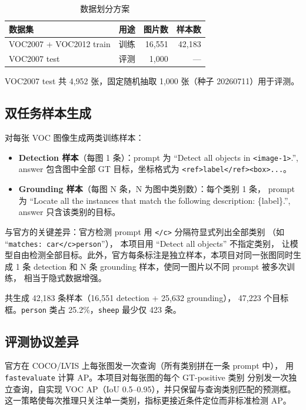 \documentclass[11pt,a4paper]{article}
\begin{document}
\begin{table}[H]
\centering\small
\caption{数据划分方案}\label{tab:split}
\begin{tabularx}{\textwidth}{llrr}
\toprule
\textbf{数据集} & \textbf{用途} & \textbf{图片数} & \textbf{样本数} \\
\midrule
VOC2007 + VOC2012 train & 训练 & 16{,}551 & 42{,}183 \\
VOC2007 test             & 评测 & 1{,}000 & — \\
\bottomrule
\end{tabularx}
\end{table}

VOC2007 test 共 4{,}952 张，固定随机抽取 1{,}000 张（种子 20260711）用于评测。

\subsection{双任务样本生成}

对每张 VOC 图像生成两类训练样本：

\begin{itemize}
\item \textbf{Detection 样本}（每图 1 条）：prompt 为 ``Detect all objects in \texttt{<image-1>}.'',
      answer 包含图中全部 GT 目标，坐标格式为 \texttt{<ref>label</ref><box>...}。
\item \textbf{Grounding 样本}（每图 N 条，N 为图中类别数）：每个类别 1 条，
      prompt 为 ``Locate all the instances that match the following description: \{label\}.'',
      answer 只含该类别的目标。
\end{itemize}

与官方的关键差异：官方检测 prompt 用 \texttt{</c>} 分隔符显式列出全部类别
（如 ``\texttt{matches: car}\allowbreak\texttt{</c>}\allowbreak\texttt{person}''），
本项目用 ``Detect all objects'' 不指定类别，
让模型自由检测全部目标。此外，官方每条标注是独立样本，本项目对同一张图同时生成
1 条 detection 和 N 条 grounding 样本，使同一图片以不同 prompt 被多次训练，
相当于隐式数据增强。

共生成 42{,}183 条样本（16{,}551 detection + 25{,}632 grounding），
47{,}223 个目标框。\texttt{person} 类占 25.2\%，\texttt{sheep} 最少仅 423 条。

\subsection{评测协议差异}

官方在 COCO/LVIS 上每张图发一次查询（所有类别拼在一条 prompt 中），
用 \texttt{fastevaluate} 计算 AP。本项目对每张图的每个 GT-positive 类别
分别发一次独立查询，自实现 VOC AP（IoU 0.5--0.95），并只保留与查询类别匹配的预测框。
这一策略使每次推理只关注单一类别，指标更接近条件定位而非标准检测 AP。
\end{document}
